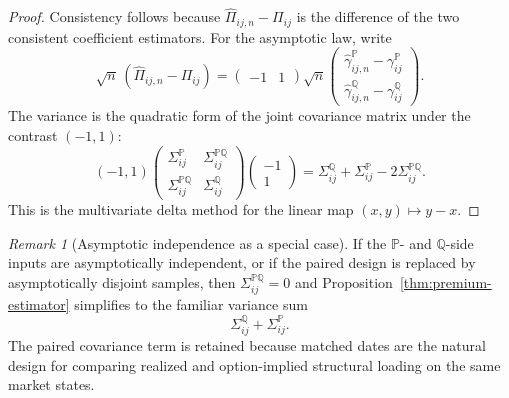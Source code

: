 \documentclass[11pt,a4paper]{amsart}
\theoremstyle{plain}
\theoremstyle{definition}
\theoremstyle{remark}
\newtheorem{remark}[theorem]{Remark}
\newcommand{\PP}{\mathbb{P}}
\newcommand{\QQ}{\mathbb{Q}}
\begin{document}
\begin{proof}
Consistency follows because \(\widehat\Pi_{ij,n}-\Pi_{ij}\) is the difference of the two consistent
coefficient estimators.  For the asymptotic law, write
\[
        \sqrt{n}\,(\widehat\Pi_{ij,n}-\Pi_{ij})
        =
        \begin{pmatrix}
                -1 & 1
        \end{pmatrix}
        \sqrt{n}
        \begin{pmatrix}
                \widehat\gamma_{ij,n}^\PP-\gamma_{ij}^\PP\\
                \widehat\gamma_{ij,n}^\QQ-\gamma_{ij}^\QQ
        \end{pmatrix}.
\]
The variance is the quadratic form of the joint covariance matrix under the contrast \((-1,1)\):
\[
        (-1,1)
        \begin{pmatrix}
        \Sigma_{ij}^\PP & \Sigma_{ij}^{\PP\QQ}\\
        \Sigma_{ij}^{\PP\QQ} & \Sigma_{ij}^\QQ
        \end{pmatrix}
        \begin{pmatrix}-1\\1\end{pmatrix}
        =
        \Sigma_{ij}^\QQ+\Sigma_{ij}^\PP-2\Sigma_{ij}^{\PP\QQ}.
\]
This is the multivariate delta method for the linear map \((x,y)\mapsto y-x\).
\end{proof}

\begin{remark}[Asymptotic independence as a special case]
If the \(\PP\)- and \(\QQ\)-side inputs are asymptotically independent, or if the paired design is
replaced by asymptotically disjoint samples, then \(\Sigma_{ij}^{\PP\QQ}=0\) and
Proposition~\ref{thm:premium-estimator} simplifies to the familiar variance sum
\[
        \Sigma_{ij}^\QQ+\Sigma_{ij}^\PP.
\]
The paired covariance term is retained because matched dates are the natural design
for comparing realized and option-implied structural loading on the same market states.
\end{remark}
\end{document}
